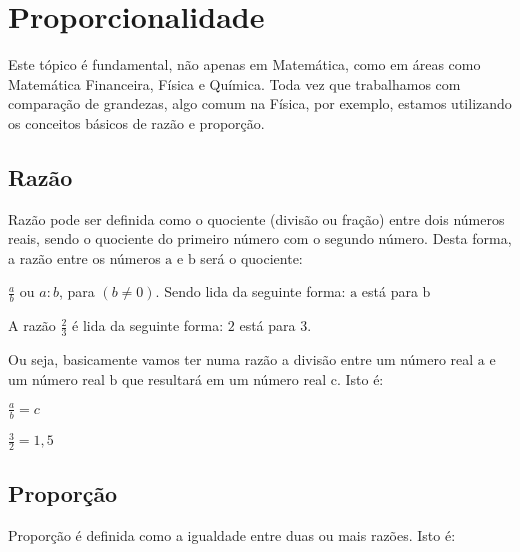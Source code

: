 \chapter{Proporcionalidade}
Este tópico é fundamental, não apenas em Matemática, como em \'areas como Matemática Financeira, Física e Química. Toda vez que trabalhamos com comparação de grandezas, algo comum na Física, por exemplo, estamos utilizando os conceitos básicos de raz\~ao e proporção.   

\section{Razão}

\begin{definition}
    Razão pode ser definida como o quociente (divisão ou fração) entre dois números reais, sendo o quociente do primeiro número com o segundo número. Desta forma, a razão entre os números $\mathrm{a}$ e $\mathrm{b}$ será o quociente:
\end{definition}

	
	\begin{center}
		$\frac{a}{b}$ ou $a:b$, para $(b \neq 0)$. 	Sendo lida da seguinte forma: 
		$\mathrm{a}$ está para $\mathrm{b}$
	\end{center}


	\begin{example}
	A razão $\frac{2}{3}$ é lida da seguinte forma: $2$ está para $3$.
	\end{example}

Ou seja, basicamente vamos ter numa razão a divisão entre um número real $\mathrm{a}$ e um número real $\mathrm{b}$ que resultará em um número real $\mathrm{c}$. Isto é:  

	\begin{center}
		$\frac{a}{b} = c$ 
	\end{center}
	
	\begin{example}
	   $\frac{3}{2} = 1,5$
	\end{example}

\section{Proporção}

\begin{definition}
    Proporção é definida como a igualdade entre duas ou mais razões. Isto é:
\end{definition}


